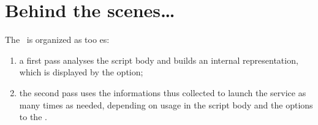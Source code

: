 \section{Behind the scenes\dots}

The \mfslInterp\ is organized as too \pass es:
\begin{enumerate}
\item a first pass analyses the script body and builds an internal representation, which is displayed by the  option;

\item the second pass uses the informations thus collected to launch the service as many times as needed, depending on   usage in the script body and the  options to the \mfslInterp.
\end{enumerate}
